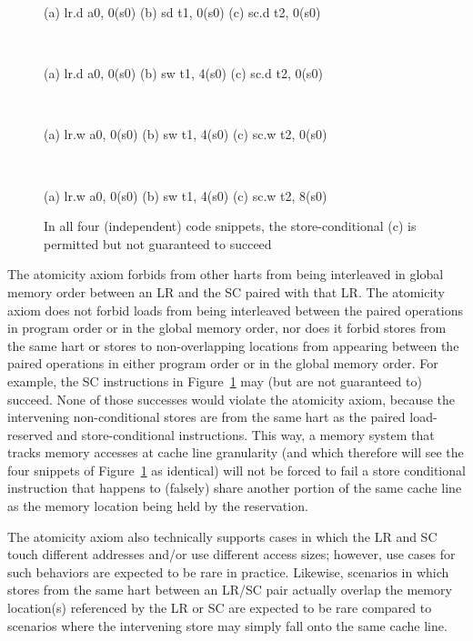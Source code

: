 \begin{figure}[h!]
  \centering\small
  \begin{verbbox}
  (a) lr.d a0, 0(s0)
  (b) sd   t1, 0(s0)
  (c) sc.d t2, 0(s0)
  \end{verbbox}
  \theverbbox
  ~~~~~~
  \begin{verbbox}
  (a) lr.d a0, 0(s0)
  (b) sw   t1, 4(s0)
  (c) sc.d t2, 0(s0)
  \end{verbbox}
  \theverbbox
  ~~~~~~
  \begin{verbbox}
  (a) lr.w a0, 0(s0)
  (b) sw   t1, 4(s0)
  (c) sc.w t2, 0(s0)
  \end{verbbox}
  \theverbbox
  ~~~~~~
  \begin{verbbox}
  (a) lr.w a0, 0(s0)
  (b) sw   t1, 4(s0)
  (c) sc.w t2, 8(s0)
  \end{verbbox}
  \theverbbox
  \caption{In all four (independent) code snippets, the store-conditional (c) is permitted but not guaranteed to succeed}
  \label{fig:litmus:lrsdsc}
\end{figure}

The atomicity axiom forbids from other harts from being interleaved in global memory order between an LR and the SC paired with that LR.
The atomicity axiom does not forbid loads from being interleaved between the paired operations in program order or in the global memory order, nor does it forbid stores from the same hart or stores to non-overlapping locations from appearing between the paired operations in either program order or in the global memory order.
For example, the SC instructions in Figure~\ref{fig:litmus:lrsdsc} may (but are not guaranteed to) succeed.
None of those successes would violate the atomicity axiom, because the intervening non-conditional stores are from the same hart as the paired load-reserved and store-conditional instructions.
This way, a memory system that tracks memory accesses at cache line granularity (and which therefore will see the four snippets of Figure~\ref{fig:litmus:lrsdsc} as identical) will not be forced to fail a store conditional instruction that happens to (falsely) share another portion of the same cache line as the memory location being held by the reservation.

The atomicity axiom also technically supports cases in which the LR and SC touch different addresses and/or use different access sizes; however, use cases for such behaviors are expected to be rare in practice.
Likewise, scenarios in which stores from the same hart between an LR/SC pair actually overlap the memory location(s) referenced by the LR or SC are expected to be rare compared to scenarios where the intervening store may simply fall onto the same cache line.

